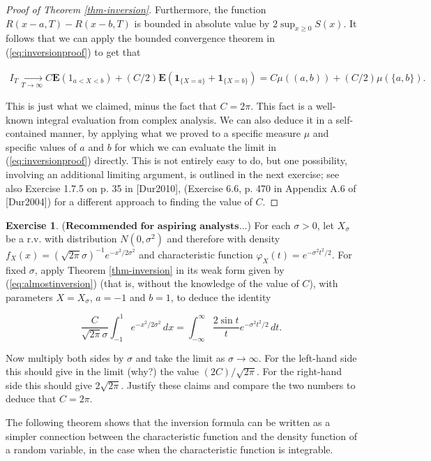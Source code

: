 \documentclass[11pt]{report}
\theoremstyle{plain}
\theoremstyle{definition}
\newtheorem{xexercise}[thm]{Exercise}
\begin{document}
\begin{proof}[Proof of Theorem \ref{thm-inversion}]
Furthermore, the function $R(x-a,T)-R(x-b,T)$ is
bounded in absolute value by $2\sup_{x\ge 0} S(x)$.
It follows that we can apply the bounded convergence
theorem in (\ref{eq:inversionproof}) to get that

\begin{align*}
\tag{23}\label{eq:almostinversion}
I_T \xrightarrow[T\to\infty]{} C \mathbf{E}(1_{a<X<b}) + (C/2) \mathbf{E}(\mathbf{1}_{\{X=a\}} + \mathbf{1}_{\{X=b\}}) = C \mu((a,b)) + (C/2)\mu(\{a,b\}).
\end{align*}

This is just what we claimed, minus the fact that
$C=2\pi$. This fact is a well-known integral
evaluation from complex analysis. We can also deduce
it in a self-contained manner, by applying what we
proved to a specific measure $\mu$ and specific
values of $a$ and $b$ for which we can evaluate the
limit in (\ref{eq:inversionproof}) directly. This is not
entirely easy to do, but one possibility, involving an
additional limiting argument, is outlined in the next
exercise; see also Exercise 1.7.5 on p. 35 in
[Dur2010], (Exercise 6.6, p. 470 in Appendix A.6 of
[Dur2004]) for a different approach to finding the
value of $C$.
\end{proof}

\begin{xexercise}
($\textbf{Recommended for aspiring analysts}$...) For
each $\sigma>0$, let $X_\sigma$ be a r.v. with
distribution $N(0,\sigma^2)$ and therefore with
density
$f_X(x)=(\sqrt{2\pi}\sigma)^{-1} e^{-x^2/2\sigma^2}$
and characteristic function
$\varphi_X(t) = e^{-\sigma^2 t^2/2}$. For fixed
$\sigma$, apply Theorem \ref{thm-inversion} in its weak
form given by (\ref{eq:almostinversion}) (that is, without
the knowledge of the value of $C$), with parameters
$X=X_\sigma$, $a=-1$ and $b=1$,  to deduce the
identity

\[
\frac{C}{\sqrt{2\pi}\sigma} \int_{-1}^1 e^{-x^2/2\sigma^2}\,dx = \int_{-\infty}^\infty \frac{2\sin t}{t} e^{-\sigma^2 t^2/2}\,dt.
\]

Now multiply both sides by $\sigma$ and take the
limit as $\sigma\to\infty$. For the left-hand side
this should give in the limit (why?) the value
$(2C)/\sqrt{2\pi}$. For the right-hand side this
should give $2\sqrt{2\pi}$. Justify these claims and
compare the two numbers to deduce that $C=2\pi$.
\end{xexercise}

The following theorem shows that the inversion
formula can be written as a simpler connection between
the characteristic function and the density function
of a random variable, in the case when the
characteristic function is integrable.
\end{document}
